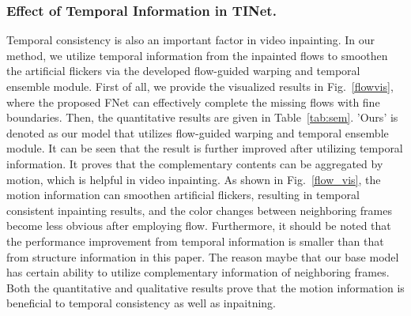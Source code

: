 \subsubsection{Effect of Temporal Information in TINet.}
Temporal consistency is also an important factor in video inpainting. In our method, we utilize temporal information from the inpainted flows to smoothen the artificial flickers via the developed flow-guided warping and temporal ensemble module. 
First of all, we provide the visualized results in Fig.~\ref{flowvis}, where the proposed FNet can effectively complete the missing flows with fine boundaries.
Then, the quantitative results are given in Table~\ref{tab:sem}.
'Ours' is denoted as our model that utilizes flow-guided warping and temporal ensemble module.
It can be seen that the result is further improved after utilizing temporal information. It proves that the complementary contents can be aggregated by motion, which is helpful in video inpainting. 
As shown in Fig.~\ref{flow_vis}, the motion information can smoothen artificial flickers, resulting in temporal consistent inpainting results, and the color changes between neighboring frames become less obvious after employing flow.
Furthermore, it should be noted that the performance improvement from temporal information is smaller than that from structure information in this paper.
The reason maybe that our base model has certain ability to utilize complementary information of neighboring frames.
Both the quantitative and qualitative results prove that the motion information is beneficial to temporal consistency as well as inpaitning.



